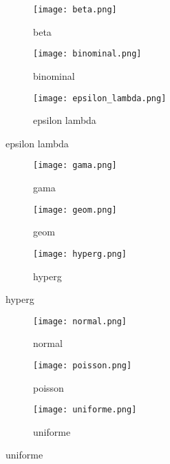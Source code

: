 \begin{figure}[H]
    \begin{subfigure}{0.3\textwidth}
        \texttt{[image: beta.png]}
        \caption{beta}
    \end{subfigure}
    \begin{subfigure}{0.3\textwidth}
        \texttt{[image: binominal.png]}
        \caption{binominal}
    \end{subfigure}
    \begin{subfigure}{0.3\textwidth}
        \texttt{[image: epsilon\_lambda.png]}
        \caption{epsilon lambda}
    \end{subfigure}
\end{figure}

\begin{figure}[H]
    \begin{subfigure}{0.3\textwidth}
        \texttt{[image: gama.png]}
        \caption{gama}
    \end{subfigure}
    \begin{subfigure}{0.3\textwidth}
        \texttt{[image: geom.png]}
        \caption{geom}
    \end{subfigure}
    \begin{subfigure}{0.3\textwidth}
        \texttt{[image: hyperg.png]}
        \caption{hyperg}
    \end{subfigure}
\end{figure}

\begin{figure}[H]
    \begin{subfigure}{0.3\textwidth}
        \texttt{[image: normal.png]}
        \caption{normal}
    \end{subfigure}
    \begin{subfigure}{0.3\textwidth}
        \texttt{[image: poisson.png]}
        \caption{poisson}
    \end{subfigure}
    \begin{subfigure}{0.3\textwidth}
        \texttt{[image: uniforme.png]}
        \caption{uniforme}
    \end{subfigure}
\end{figure}